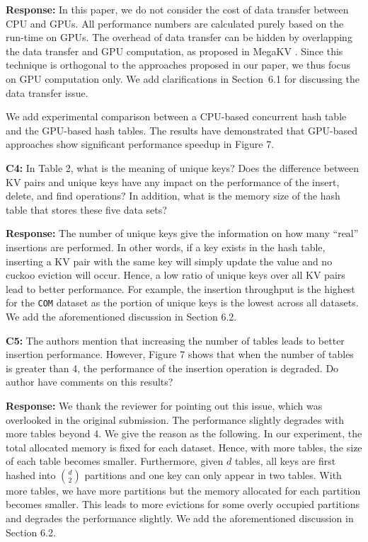 \noindent\textbf{Response:} 
In this paper, we do not consider the cost of data transfer between CPU and GPUs. All performance numbers are calculated purely based on the run-time on GPUs. 
The overhead of data transfer can be hidden by overlapping the data transfer and GPU computation, as proposed in MegaKV \cite{zhang2015mega}. Since this technique is orthogonal to the approaches proposed in our paper, we thus focus on GPU computation only. We add clarifications in Section~6.1 for discussing the data transfer issue.

We add experimental comparison between a CPU-based concurrent hash table \cite{li2014algorithmic} and the GPU-based hash tables. The results have demonstrated that GPU-based approaches show significant performance speedup in Figure 7.  

\begin{shaded}
	\noindent\textbf{C4:} In Table 2, what is the meaning of unique keys? Does the difference between KV pairs and unique keys have any impact on the performance of the insert, delete, and find operations? In addition, what is the memory size of the hash table that stores these five data sets?
\end{shaded}

\noindent\textbf{Response:} 
The number of unique keys give the information on how many ``real'' insertions are performed. In other words, if a key exists in the hash table, inserting a KV pair with the same key will simply update the value and no cuckoo eviction will occur. Hence, a low ratio of unique keys over all KV pairs lead to better performance. For example, the insertion throughput is the highest for the {\tt COM} dataset as the portion of unique keys is the lowest across all datasets. We add the aforementioned discussion in Section 6.2.

\begin{shaded}
	\noindent\textbf{C5:} The authors mention that increasing the number of tables leads to better insertion performance. However, Figure 7 shows that when the number of tables is greater than 4, the performance of the insertion operation is degraded. Do author have comments on this results?
\end{shaded}

\noindent\textbf{Response:} We thank the reviewer for pointing out this issue, which was overlooked in the original submission. The performance slightly degrades with more tables beyond 4. We give the reason as the following. In our experiment, the total allocated memory is fixed for each dataset. 
Hence, with more tables, the size of each table becomes smaller. Furthermore, given $d$ tables, all keys are first hashed into $\binom{d}{2}$ partitions and one key can only appear in two tables. 
With more tables, we have more partitions but the memory allocated for each partition becomes smaller. This leads to more evictions for some overly occupied partitions and degrades the performance slightly. We add the aforementioned discussion in Section 6.2.